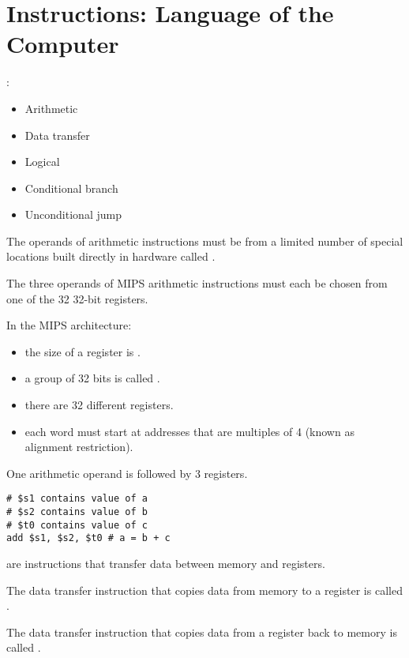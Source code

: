 \chapter{Instructions: Language of the Computer}

  \par {}:
  \begin{itemize}
    \item Arithmetic
    \item Data transfer
    \item Logical
    \item Conditional branch
    \item Unconditional jump
  \end{itemize}

  \par The operands of arithmetic instructions must be from a limited number
    of special locations built directly in hardware called .
  \par The three operands of MIPS arithmetic instructions must each be chosen
    from one of the 32 32-bit registers.

    \par In the MIPS architecture:
    \begin{itemize}
      \item the size of a register is .
      \item a group of 32 bits is called .
      \item there are 32 different registers.
      \item each word must start at addresses that are multiples of 4 (known
        as alignment restriction).
    \end{itemize}

    \par One arithmetic operand is followed by 3 registers.
    \begin{lstlisting}
# $s1 contains value of a
# $s2 contains value of b
# $t0 contains value of c
add $s1, $s2, $t0 # a = b + c
    \end{lstlisting}

    \par {} are instructions that transfer data
      between memory and registers.
    \par The data transfer instruction that copies data from memory to a
      register is called .
    \par The data transfer instruction that copies data from a register back
      to memory is called .

